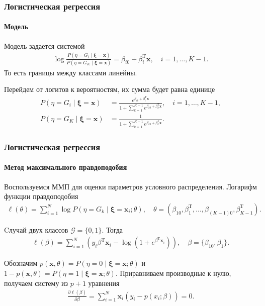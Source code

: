 \documentclass{beamer}
\begin{document}
\begin{frame}
  \frametitle{Логистическая регрессия}
  \framesubtitle{Модель}
 Модель задается системой
  \begin{align*}
    \log\frac{P(\eta = G_i \mid \boldsymbol{\xi} = \mathbf{x})}{P(\eta = G_K \mid \boldsymbol{\xi} = \mathbf{x})} = \beta_{i0} + \beta_{i}^\mathrm{T}\mathbf{x}, \quad i = 1,\ldots, K - 1.
  \end{align*}
  То есть границы между классами линейны.

Перейдем от логитов к вероятностям, их сумма будет равна единице
  \begin{align*}
    P(\eta = G_i \mid \boldsymbol{\xi} = \mathbf{x}) &= \frac{e^{\beta_{i0} + \beta^\mathrm{T}_i \mathbf{x}}}{1 + \sum_{k = 1}^{K - 1}e^{\beta_{k0} + \beta^\mathrm{T}_k \mathbf{x}}}, \quad i = 1,\ldots, K - 1,\\
    P(\eta = G_K \mid \boldsymbol{\xi} = \mathbf{x}) &= \frac{1}{1 + \sum_{k = 1}^{K - 1}e^{\beta_{k0} + \beta^\mathrm{T}_k \mathbf{x}}}.
  \end{align*}
\end{frame}
\begin{frame}
  \frametitle{Логистическая регрессия}
  \framesubtitle{Метод максимального правдоподобия}
  Воспользуемся ММП для оценки параметров условного распределения. Логарифм функции правдоподобия
  \begin{align*}
    \ell(\theta) = \sum_{i = 1}^{N} \log P(\eta = G_k \mid \boldsymbol{\xi} = \mathbf{x}_i; \theta), \quad \theta = (\beta_{10}, \beta_{1}^\mathrm{T},\ldots,\beta_{(K-1)0}, \beta_{K - 1}^\mathrm{T}).
  \end{align*}

  Cлучай двух классов $\mathcal{G} = \{0, 1\}$. Тогда
  \begin{align*}
    \ell(\beta) = \sum_{i = 1}^{N}(y_i\beta^\mathrm{T}\mathbf{x}_i - \log(1 + e^{\beta^\mathrm{T}\mathbf{x}_i})), \quad \beta = \{\beta_{10}, \beta_1\}.
  \end{align*}

Обозначим $p(\mathbf{x}, \theta) = P(\eta = 0 \mid \boldsymbol{\xi} = \mathbf{x}; \theta)$ и $1 - p(\mathbf{x}, \theta) = P(\eta = 1 \mid \boldsymbol{\xi} = \mathbf{x}; \theta)$. Приравниваем производные к нулю, получаем систему из $p + 1$ уравнения
  \begin{align*}
    \frac{\partial \ell(\beta)}{\partial \beta} = \sum_{i = 1}^N \mathbf{x}_i (y_i - p(x_i; \beta)) = 0.
  \end{align*}
\end{frame}
\end{document}

